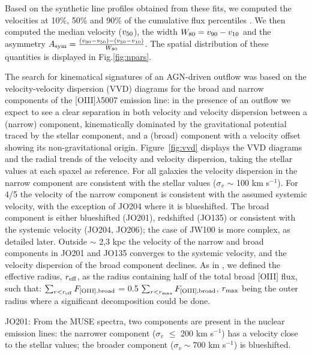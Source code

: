 \documentclass[fleqn,usenatbib]{mnras}
\begin{document}
Based on the synthetic line profiles obtained from these fits, we computed the velocities at 10\%, 50\% and 90\% of the cumulative flux percentiles \citep[e.g.][]{2014MNRAS.441.3306H,
2013MNRAS.436.2576L,2016AA...585A.148B}.
We then computed the median velocity ($v_{\rm 50}$),  the width $W_{\rm 80} = v_{\rm 90} - v_{\rm 10}$ and the asymmetry $A_{\rm sym} = \frac{(v_{\rm 90} - v_{\rm 50}) - (v_{\rm 50} - v_{\rm 10}) }{W_{\rm 80}}$. The spatial distribution of these quantities is displayed in Fig.\ref{fig:npars}.


The search for kinematical signatures of an AGN-driven outflow was based on the velocity-velocity dispersion (VVD) diagrams \citep{2016ApJ...817..108W,2016ApJ...819..148K} for the broad and narrow components of the [OIII]$\lambda$5007 emission line: in the presence of an outflow we expect to see a clear separation in both velocity and velocity dispersion between a (narrow) component, kinematically dominated by the gravitational potential traced by the stellar component, and a (broad) component with a velocity offset showing its non-gravitational origin. Figure~\ref{fig:vvd} displays the VVD diagrams and the radial trends of the velocity and velocity dispersion, taking the stellar values at each spaxel as reference. For all galaxies the velocity dispersion in the narrow component are consistent with the stellar values ($\sigma_v$ $\sim$ 100 km s$^{-1}$). For 4/5 the velocity of the narrow component is consistent with the assumed systemic velocity, with the exception of JO204 where it is blueshifted. The broad component is either blueshifted (JO201), redshifted (JO135) or consistent with the systemic velocity  (JO204, JO206); the case of JW100 is more complex, as detailed later.
Outside $\sim$ 2,3 kpc the velocity of the narrow and broad components  in JO201 and JO135 converges to the systemic velocity, and the velocity dispersion of the broad component declines. As in \citep{2016ApJ...819..148K}, we defined the effective radius, $r_{\rm eff}$, as the radius containing half of the total broad [OIII] flux, such that:  $\sum_{r<r_{\rm eff}} F_{\rm [OIII], broad}$ = 0.5 $\sum_{r<r_{\rm max}} F_{\rm [OIII], broad}$, $r_{\rm max}$ being the outer radius where a significant decomposition could be done. 



JO201: From the MUSE spectra, two components are present in the nuclear emission lines: the narrower component ($\sigma_v$ $\le$ 200 km s$^{-1}$) has a velocity close to the stellar values; the broader component ($\sigma_v \sim 700$ km s$^{-1}$) is  blueshifted.
\end{document}
